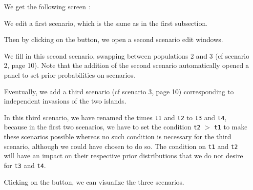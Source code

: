 \newpage
We get the following screen :

We edit a first scenario, which is the same as in the first subsection.

Then by clicking on the   button, we open a second scenario edit windows.

\newpage
We fill in this second scenario, swapping between populations 2 and 3 (cf scenario 2, page 10). Note that the addition of the second scenario automatically opened a panel to set prior probabilities on scenarios.


Eventually, we add a third scenario (cf scenario 3, page 10) corresponding to independent invasions of the two islands.


In this third scenario, we have renamed the times \texttt{t1} and \texttt{t2} to \texttt{t3} and \texttt{t4}, because in the first two scenarios, we have to set the condition \texttt{t2} $>$ \texttt{t1} to make these scenarios possible whereas no such condition is necessary for the third scenario, although we could have chosen to do so. The condition on \texttt{t1} and \texttt{t2} will have an impact on their respective prior distributions that we do not desire for \texttt{t3} and \texttt{t4}.

\newpage
Clicking on the   button, we can visualize the three scenarios.


